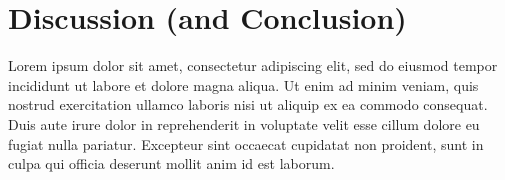 \documentclass[sigchi]{acmart}
\begin{document}
\section{Discussion (and Conclusion)}

Lorem ipsum dolor sit amet, consectetur adipiscing elit, sed do eiusmod tempor incididunt ut labore et dolore magna aliqua. Ut enim ad minim veniam, quis nostrud exercitation ullamco laboris nisi ut aliquip ex ea commodo consequat. Duis aute irure dolor in reprehenderit in voluptate velit esse cillum dolore eu fugiat nulla pariatur. Excepteur sint occaecat cupidatat non proident, sunt in culpa qui officia deserunt mollit anim id est laborum.



\end{document}
